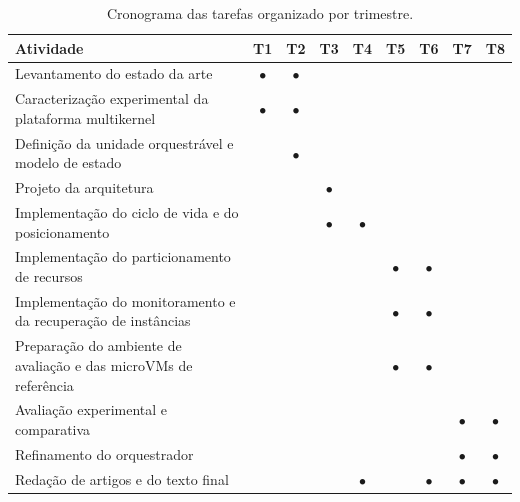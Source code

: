 \documentclass[12pt]{article}
\begin{document}
\begin{table}[ht]
  \centering
  \caption{Cronograma das tarefas organizado por trimestre.}
  \label{tab:crono}
  \small
  \renewcommand{\arraystretch}{1.25}
  \begin{tabular}{p{7.2cm}cccccccc}
    \hline
    \textbf{Atividade} & T1 & T2 & T3 & T4 & T5 & T6 & T7 & T8 \\
    \hline
    Levantamento do estado da arte                                   & $\bullet$ & $\bullet$ &           &           &           &           &           &           \\
    Caracterização experimental da plataforma multikernel            & $\bullet$ & $\bullet$ &           &           &           &           &           &           \\
    Definição da unidade orquestrável e modelo de estado             &           & $\bullet$ &           &           &           &           &           &           \\
    Projeto da arquitetura                                           &           &           & $\bullet$ &           &           &           &           &           \\
    Implementação do ciclo de vida e do posicionamento               &           &           & $\bullet$ & $\bullet$ &           &           &           &           \\
    Implementação do particionamento de recursos                     &           &           &           &           & $\bullet$ & $\bullet$ &           &           \\
    Implementação do monitoramento e da recuperação de instâncias    &           &           &           &           & $\bullet$ & $\bullet$ &           &           \\
    Preparação do ambiente de avaliação e das microVMs de referência &           &           &           &           & $\bullet$ & $\bullet$ &           &           \\
    Avaliação experimental e comparativa                             &           &           &           &           &           &           & $\bullet$ & $\bullet$ \\
    Refinamento do orquestrador                                      &           &           &           &           &           &           & $\bullet$ & $\bullet$ \\
    Redação de artigos e do texto final                              &           &           &           & $\bullet$ &           & $\bullet$ & $\bullet$ & $\bullet$ \\
    \hline
  \end{tabular}
\end{table}
\end{document}
